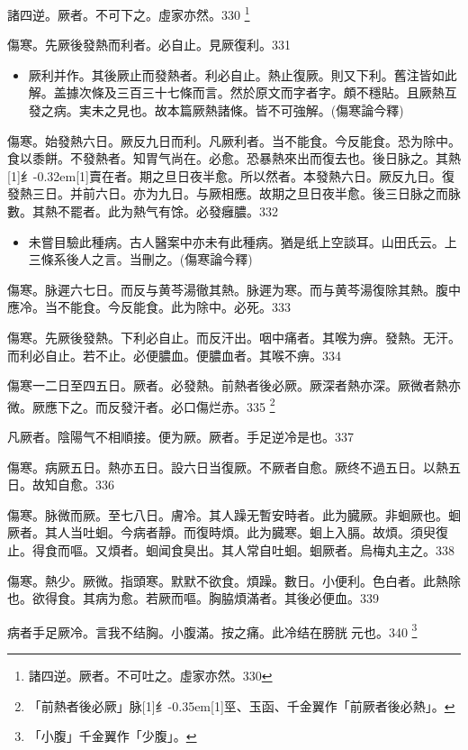 \documentclass[11pt,oneside,b5paper]{ctexbook}
\begin{document}
\begin{flushleft}
諸四逆。厥者。不可下之。虛家亦然。330
\footnote{諸四逆。厥者。不可吐之。虛家亦然。330}

傷寒。先厥後發熱而利者。必自止。見厥復利。331

\begin{itemize}
\item 厥利并作。其後厥止而發熱者。利必自止。熱止復厥。則又下利。舊注皆如此解。盖據次條及三百三十七條而言。然於原文而字者字。頗不穩貼。且厥熱互發之病。実未之見也。故本篇厥熱諸條。皆不可強解。(傷寒論今釋)
\end{itemize}

傷寒。始發熱六日。厥反九日而利。凡厥利者。当不能食。今反能食。恐为除中。食以黍餅。不發熱者。知胃气尚在。必愈。恐暴熱來出而復去也。後日脉之。其熱{\hbox{\scalebox{0.6}[1]{纟}\kern-0.32em\scalebox{0.7}[1]{賣}}}在者。期之旦日夜半愈。所以然者。本發熱六日。厥反九日。復發熱三日。并前六日。亦为九日。与厥相應。故期之旦日夜半愈。後三日脉之而脉數。其熱不罷者。此为熱气有馀。必發癰膿。332

\begin{itemize}
\item 未嘗目驗此種病。古人醫案中亦未有此種病。猶是纸上空談耳。山田氏云。上三條系後人之言。当刪之。(傷寒論今釋)
\end{itemize}

傷寒。脉遲六七日。而反与黄芩湯徹其熱。脉遲为寒。而与黄芩湯復除其熱。腹中應冷。当不能食。今反能食。此为除中。必死。333

傷寒。先厥後發熱。下利必自止。而反汗出。咽中痛者。其喉为痹。發熱。无汗。而利必自止。若不止。必便膿血。便膿血者。其喉不痹。334

傷寒一二日至四五日。厥者。必發熱。前熱者後必厥。厥深者熱亦深。厥微者熱亦微。厥應下之。而反發汗者。必口傷烂赤。335
\footnote{「前熱者後必厥」脉{\hbox{\scalebox{0.68}[1]{纟}\kern-0.35em\scalebox{0.64}[1]{巠}}}、玉函、千金翼作「前厥者後必熱」。}

凡厥者。陰陽气不相順接。便为厥。厥者。手足逆冷是也。337

傷寒。病厥五日。熱亦五日。設六日当復厥。不厥者自愈。厥终不過五日。以熱五日。故知自愈。336

傷寒。脉微而厥。至七八日。膚冷。其人躁无暫安時者。此为臓厥。非蛔厥也。蛔厥者。其人当吐蛔。今病者靜。而復時煩。此为臓寒。蛔上入膈。故煩。須臾復止。得食而嘔。又煩者。蛔闻食臭出。其人常自吐蛔。蛔厥者。烏梅丸主之。338

傷寒。熱少。厥微。指頭寒。默默不欲食。煩躁。數日。小便利。色白者。此熱除也。欲得食。其病为愈。若厥而嘔。胸脇煩滿者。其後必便血。339

病者手足厥冷。言我不结胸。小腹滿。按之痛。此冷结在膀胱{𬮦}元也。340
\footnote{「小腹」千金翼作「少腹」。}


\end{flushleft}
\end{document}
